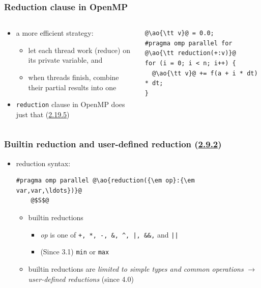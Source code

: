 \documentclass[12pt,dvipdfmx]{beamer}
\newcommand{\sectionompfor}{{\href{https://www.openmp.org/spec-html/5.0/openmpsu41.html\#x64-1290002.9.2}{2.9.2}}}
\newcommand{\sectionompreduction}{{\href{https://www.openmp.org/spec-html/5.0/openmpsu107.html\#x140-5800002.19.5}{2.19.5}}}
\newcommand{\ao}[1]{{\color{blue}#1}}
\newcommand{\aka}[1]{{\color{red}#1}}
\begin{document}
\begin{frame}[fragile]
\frametitle{Reduction clause in OpenMP}
\begin{columns}
  \begin{column}{0.5\textwidth}
    \begin{itemize}
    \item a more efficient strategy:
      \begin{itemize}
      \item let each thread work (reduce) on its private variable, and
      \item when threads finish, combine their partial results into one 
      \end{itemize}

    \item {\tt reduction} clause in OpenMP does just that
      (\sectionompreduction)
\end{itemize}
\end{column}

\begin{column}{0.45\textwidth}
\begin{lstlisting}
@\ao{\tt v}@ = 0.0;
#pragma omp parallel for @\ao{\tt reduction(+:v)}@
for (i = 0; i < n; i++) {
  @\ao{\tt v}@ += f(a + i * dt) * dt;
}    
\end{lstlisting}

\def\svgwidth{\textwidth}
{\scriptsize }
\end{column}  

\end{columns}
\end{frame}

\begin{frame}[fragile]
\frametitle{Builtin reduction and user-defined reduction (\sectionompfor)}
\begin{itemize}
\item reduction syntax:
\begin{lstlisting}
#pragma omp parallel @\ao{reduction({\em op}:{\em var,var,\ldots})}@
    @$S$@
\end{lstlisting}
\begin{itemize}
\item builtin reductions
  \begin{itemize}
  \item {\em op} is one of \verb!+, *, -, &, ^, |, &&,! and {\tt ||}
  \item (Since 3.1) {\tt min} or {\tt max}
  \end{itemize}
\item builtin reductions are \aka{\it limited to simple types and common operations}
  $\rightarrow$ \ao{\it user-defined reductions} (since 4.0) 
\end{itemize}
\end{itemize}
\end{frame}
\end{document}
